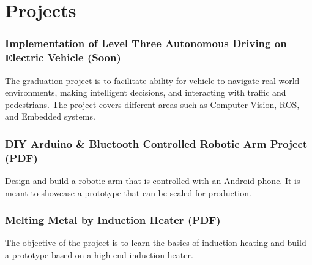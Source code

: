 \section*{Projects}
%
%
%
\subsubsection*{\large
  {\blackColor Implementation of Level Three Autonomous Driving on Electric Vehicle}
  \small
  (Soon)
}
The graduation project is to facilitate ability for vehicle to navigate real-world environments, making intelligent decisions, and interacting with traffic and pedestrians. The project covers different areas such as Computer Vision, ROS, and Embedded systems.
%
%
\subsubsection*{\large
  {\blackColor DIY Arduino \& Bluetooth Controlled Robotic Arm Project}
  \small
  \href{https://drive.google.com/file/d/1gmzZdRsunAH3hOsSkZU2sLoMINN6RA6X/view}{(PDF)}
}
Design and build a robotic arm that is controlled with an Android phone. It is meant to showcase a prototype that can be scaled for production.
%
%
%
%
\subsubsection*{\large
  {\blackColor Melting Metal by Induction Heater}
  \small
  \href{https://drive.google.com/file/d/1ay_cD3jObiWNZwhEC6sC6dirg7XZCQKf/view}{(PDF)}
}
The objective of the project is to learn the basics of induction heating and build a prototype based on a high-end induction heater.